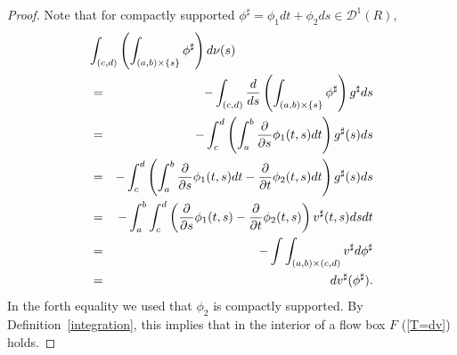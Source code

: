 \documentclass{ip-journal}
\newtheorem{proposition}[theorem]{Proposition}
\theoremstyle{definition}
\numberwithin{equation}{section}
\begin{document}
\begin{proof}
 Note that for compactly supported $\phi^\sharp=\phi_1dt+\phi_2ds \in \mathcal D^1(R)$,  
 \begin{eqnarray*}\label{dvsharp1}
  \lefteqn{\int_{(c,d)}\left(\int_{(a,b) \times \{ s\}}\phi^\sharp \right)d\nu(s)} \nonumber\\
 &=&- \int_{(c,d)}\frac{d}{ds}\left(\int_{(a,b) \times \{ s\}}\phi^\sharp \right) g^\sharp ds  \nonumber\\
 &=& -\int_c^d\left(\int_a^b \frac{\partial}{\partial s}\phi_1(t,s)dt \right) g^\sharp(s) ds \nonumber\\
 &=& -\int_c^d\left(\int_a^b \frac{\partial}{\partial s}\phi_1(t,s)dt- \frac{\partial}{\partial t}\phi_2(t,s)dt \right) g^\sharp(s) ds \\
 &=& -\int_a^b \int_c^d \left( \frac{\partial}{\partial s}\phi_1(t,s)- \frac{\partial}{\partial t}\phi_2(t,s) \right)  v^\sharp(t,s)dsdt \nonumber\\
 &=& -\int \int_{(a,b) \times (c,d)} v^\sharp d \phi^\sharp  \nonumber\\
 &=& dv^\sharp(\phi^\sharp). \nonumber
  \end{eqnarray*}
 In the forth equality we used that $\phi_2$ is compactly supported.
 By Definition~\ref{integration}, this implies that in the interior of a flow box $F$ (\ref{T=dv}) holds.
%
%
%
% 
% 

\end{proof}
\end{document}
